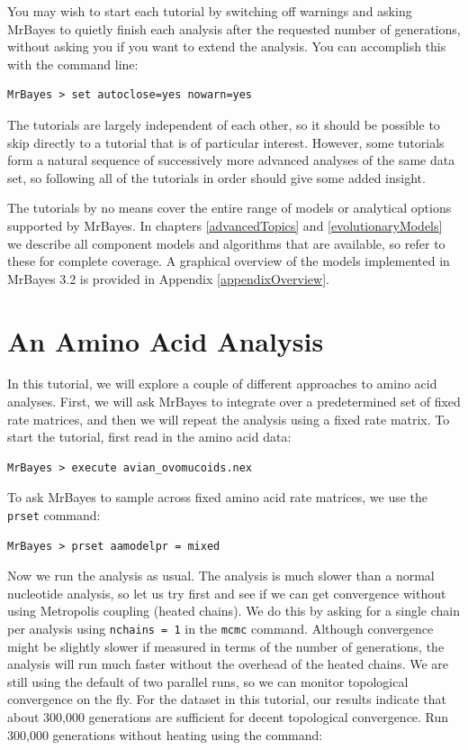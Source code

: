 \documentclass[12pt]{book}
\newcommand{\ttt}[1]{\texttt{#1} }
\begin{document}
You may wish to start each tutorial by switching off warnings and asking MrBayes to quietly finish
each analysis after the requested number of generations, without asking you if you want to extend
the analysis. You can accomplish this with the command line:

\begin{verbatim}
MrBayes > set autoclose=yes nowarn=yes
\end{verbatim}

The tutorials are largely independent of each other, so it should be possible to skip directly to
a tutorial that is of particular interest. However, some tutorials form a natural sequence of
successively more advanced analyses of the same data set, so following all of the tutorials
in order should give some added insight.

The tutorials by no means cover the entire range of models or analytical options supported
by MrBayes. In chapters \ref{advancedTopics} and \ref{evolutionaryModels} we describe all component
models and algorithms that are available, so refer to these for complete coverage.
A graphical overview of the models implemented in MrBayes 3.2 is provided in Appendix
\ref{appendixOverview}.

\section{An Amino Acid Analysis}
In this tutorial, we will explore a couple of different approaches to amino acid analyses. First, we will
ask MrBayes to integrate over a predetermined set of fixed rate matrices, and then we will repeat
the analysis using a fixed rate matrix. To start the tutorial, first read in the amino acid data:

\begin{verbatim}
MrBayes > execute avian_ovomucoids.nex
\end{verbatim}

To ask MrBayes to sample across fixed amino acid rate matrices, we use the \ttt{prset} command:

\begin{verbatim}
MrBayes > prset aamodelpr = mixed
\end{verbatim}

Now we run the analysis as usual. The analysis is much slower than a normal nucleotide analysis, so
let us try first and see if we can get convergence without using Metropolis coupling (heated chains).
We do this by asking for a single chain per analysis using \ttt{nchains = 1} in
the \ttt{mcmc} command. Although convergence might be slightly slower if measured in terms of the
number of generations, the analysis will run much faster without the overhead of the heated chains.
We are still using the default of two parallel runs, so we can monitor topological convergence on the fly.
For the dataset in this tutorial, our results indicate that about 300,000 generations are sufficient for
decent topological convergence. Run 300,000 generations without heating using the command:
\end{document}
